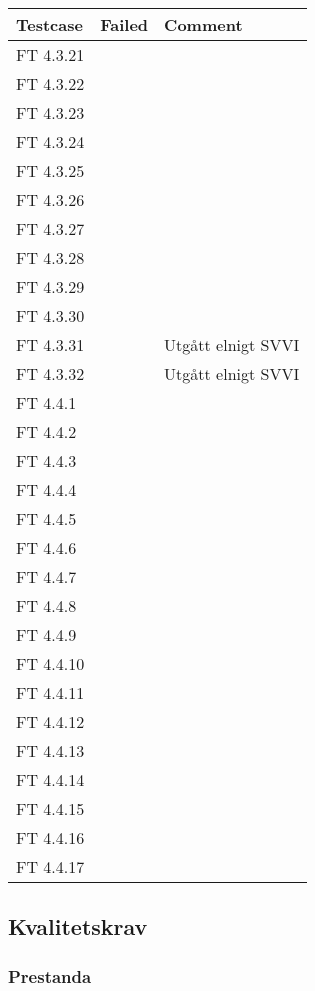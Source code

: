 \documentclass[a4paper]{article}
\begin{document}
\begin{tabular}{| l | l | p{11cm} |}
\hline
Testcase &  Failed & Comment\\
\hline
FT 4.3.21 & & \\
\hline
FT 4.3.22 & & \\
\hline
FT 4.3.23 & & \\
\hline
FT 4.3.24 & & \\
\hline
FT 4.3.25 & & \\
\hline
FT 4.3.26 & & \\
\hline
FT 4.3.27 & & \\
\hline
FT 4.3.28 & & \\
\hline
FT 4.3.29 & & \\
\hline
FT 4.3.30 & & \\
\hline
FT 4.3.31 & & Utgått elnigt SVVI\\
\hline
FT 4.3.32 & & Utgått elnigt SVVI\\
\hline
FT 4.4.1 & & \\
\hline
FT 4.4.2 & & \\
\hline
FT 4.4.3 & & \\
\hline
FT 4.4.4 & & \\
\hline
FT 4.4.5 & & \\
\hline
FT 4.4.6 & & \\
\hline
FT 4.4.7 & & \\
\hline
FT 4.4.8 & & \\
\hline
FT 4.4.9 & & \\
\hline
FT 4.4.10 & & \\
\hline
FT 4.4.11 & & \\
\hline
FT 4.4.12 & & \\
\hline
FT 4.4.13 & & \\
\hline
FT 4.4.14 & & \\
\hline
FT 4.4.15 & & \\
\hline
FT 4.4.16 & & \\
\hline
FT 4.4.17 & & \\
\hline
\end{tabular}




\subsection{Kvalitetskrav}

\subsubsection{Prestanda}
\end{document}
